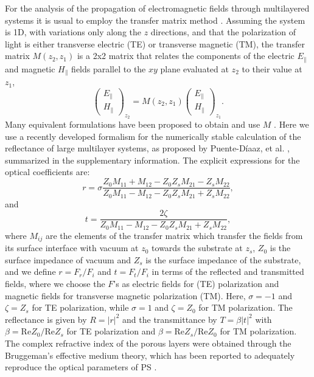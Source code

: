 \documentclass[a4paper,fleqn]{cas-sc}
\begin{document}
	For the analysis of the propagation of electromagnetic fields through
	multilayered systems it is usual to employ the transfer matrix
	method \cite{PerezA2004,Pochi2005}. Assuming the system is 1D, with variations
	only along the $z$ directions, and that the polarization of light is either
	transverse electric (TE) or transverse magnetic (TM), the
	transfer matrix $M\left(z_{2},z_{1}\right)$ is
	a 2x2 matrix that relates the components of the electric $E_{\| }$
	and magnetic  $H_{\|}$ fields parallel to the $xy$ plane
	evaluated at $z_2$ to their value at $z_{1}$,
	\begin{equation*}
		\left(
		\begin{array}{c}
			E_{\|} \\
			H_{\| }%
		\end{array}%
		\right) _{z_{2}}=M\left( z_{2},z_{1}\right) \left(
		\begin{array}{c}
			E_{\| } \\
			H_{\| }%
		\end{array}%
		\right) _{z_{1}}.
	\end{equation*}%
	Many equivalent formulations have been proposed to obtain and use $M$
	\cite{Mochan1987,Ortiz2020,Chavez2020}. Here we use a recently developed formalism
	for the numerically stable calculation of the reflectance of large
	multilayer systems, as
	proposed by Puente-Díaaz, et al. \cite{Puente2020}, summarized in the
	supplementary information. The
	explicit expressions for the optical coefficients are:
	\begin{equation}
		r=\sigma \frac{Z_{0}M_{11}+M_{12}-Z_{0}Z_{s}M_{21}-Z_s
			M_{22}}{Z_{0}M_{11}-M_{12}-Z_{0}Z_{s}M_{21}+Z_{s}M_{22}},  \label{rBloch}
	\end{equation}%
	and
	\begin{equation}
		t=\frac{2\zeta}{Z_{0}M_{11}-M_{12}-Z_{0}Z_{s}M_{21}+Z_{s}M_{22}},  \label{tBloch}
	\end{equation}%
	where $M_{ij}$ are the elements
	of the transfer matrix which transfer
	the fields from its surface interface with vacuum at $z_0$ towards the
	substrate at $z_s$,  $Z_0$ is the surface impedance of vacuum and $Z_s$ is the
	surface impedance of the substrate, and we define $r=F_r/F_i$ and $t=F_t/F_i$ in terms
	of the reflected and transmitted fields, where we choose the $F$'s as electric
	fields for (TE) polarization and magnetic fields
	for transverse magnetic polarization (TM). Here, $\sigma=-1$ and
	$\zeta= Z_s$ for TE polarization, while
	$\sigma=1$ and $\zeta=Z_0$ for TM
	polarization.
	The reflectance is given by
	$R=|r|^{2}$ and the
	transmittance by $T=\beta \left\vert t\right\vert ^{2}$ with $\beta
	=\text{Re}Z_{0}/\text{Re}Z_{s}$ for TE polarization and $\beta =\text{Re}Z_{s}/\text{Re}Z_{0}$ for
	TM polarization. The complex refractive index of the porous
	layers were obtained through the Bruggeman's effective medium theory, which
	has been reported to adequately reproduce the  optical parameters of PS
	\cite{Giusseppe2011,Pap2006,Estrada2018}.
	
\end{document}
